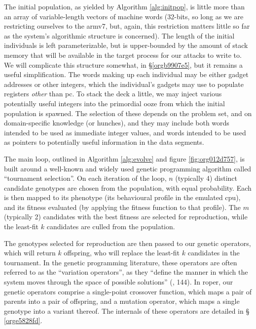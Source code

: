 \documentclass[12pt,glossary]{dalthesis}
\begin{document}
The initial population, as yielded by Algorithm \ref{alg:initpop}, is
little more than an array of variable-length vectors of machine words
 (32-bits, so long as we are restricting ourselves to the
\gls{armv7}, but, again, this restriction matters little so far as the
system's algorithmic structure is concerned). The length of the
initial individuals is left parameterizable, but is upper-bounded by
the amount of stack memory that will be available in the target
process for our attacks to write to. We will complicate this structure
somewhat, in \S \ref{orgb9907e5}, but it remains a useful
simplification. The words making up each individual may be either
gadget addresses or other integers, which the individual's gadgets may
use to populate registers \emph{other} than \gls{pc}. To stack the deck a little,
we may inject various potentially useful integers into the primordial ooze
from which the initial population is spawned. The selection of these depends
on the problem set, and on domain-specific knowledge (or hunches), and they
may include both words intended to be used as immediate integer values, and
words intended to be used as pointers to potentially useful information in
the data segments. 

The main loop, outlined in Algorithm \ref{alg:evolve} and figure \ref{fig:org012d757},
is built around a well-known and widely used genetic programming algorithm
called ``tournament selection''. On each iteration of the loop, \(n\) (typically 4)
distinct candidate genotypes are chosen from the population, with equal
probability. Each is then mapped to its phenotype (its behavioural profile in
the emulated \gls{cpu}), and its fitness evaluated (by applying the fitness
function to that profile). The \(m\) (typically 2) candidates with the best
fitness are selected for reproduction, while the least-fit \(k\) candidates are
culled from the population.

The genotypes selected for reproduction are then passed to our genetic
operators, which will return \(k\) offspring, who will replace the least-fit \(k\)
candidates in the tournament. In the genetic programming literature, these
operators are often referred to as the ``variation operators'', as they ``define the
manner in which the system moves through the space of possible solutions''
(\cite{banzhaf98}, 144). In \gls{roper}, our genetic operators comprise a
single-point crossover function, which maps a pair of parents into a pair of
offspring, and a mutation operator, which maps a single genotype into a variant
thereof. The internals of these operators are detailed in \S
\ref{orge5828fd}.
\end{document}
